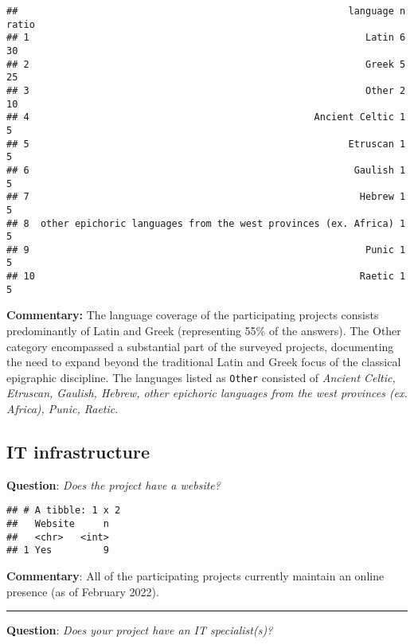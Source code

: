 \documentclass[
]{article}
\begin{document}
\begin{verbatim}
##                                                          language n ratio
## 1                                                           Latin 6    30
## 2                                                           Greek 5    25
## 3                                                           Other 2    10
## 4                                                  Ancient Celtic 1     5
## 5                                                        Etruscan 1     5
## 6                                                         Gaulish 1     5
## 7                                                          Hebrew 1     5
## 8  other epichoric languages from the west provinces (ex. Africa) 1     5
## 9                                                           Punic 1     5
## 10                                                         Raetic 1     5
\end{verbatim}

\textbf{Commentary:} The language coverage of the participating projects
consists predominantly of Latin and Greek (representing 55\% of the
answers). The Other category encompassed a substantial part of the
surveyed projects, documenting the need to expand beyond the traditional
Latin and Greek focus of the classical epigraphic discipline. The
languages listed as \texttt{Other} consisted of \emph{Ancient Celtic,
Etruscan, Gaulish, Hebrew, other epichoric languages from the west
provinces (ex. Africa), Punic, Raetic}.

\hypertarget{it-infrastructure}{%
\subsection{IT infrastructure}\label{it-infrastructure}}

\textbf{Question}: \emph{Does the project have a website?}

\begin{verbatim}
## # A tibble: 1 x 2
##   Website     n
##   <chr>   <int>
## 1 Yes         9
\end{verbatim}

\textbf{Commentary}: All of the participating projects currently
maintain an online presence (as of February 2022).

\begin{center}\rule{0.5\linewidth}{0.5pt}\end{center}

\textbf{Question}: \emph{Does your project have an IT specialist(s)?}
\end{document}
